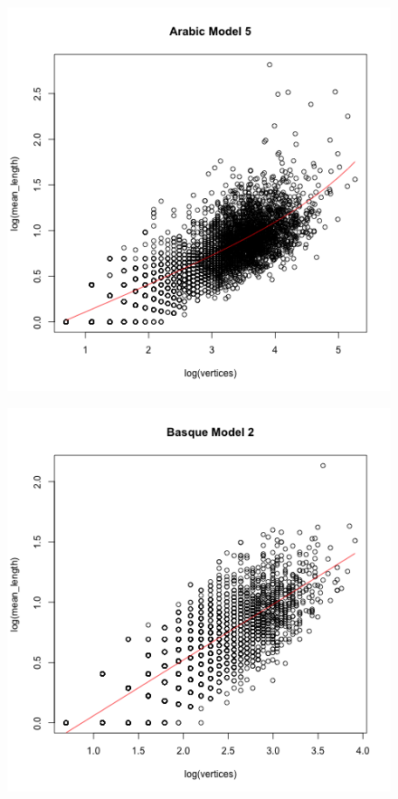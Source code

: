 \documentclass[paper=a4, fontsize=11pt]{scrartcl} %
\begin{document}
\captionsetup{justification=centering,margin=.2cm}

\begin{figure}
\centering
\begin{minipage}{.5\textwidth}
  \centering
  \includegraphics[width=\linewidth]{bestModel_Arabic.png}
  \label{fig:1}
\end{minipage}%
\begin{minipage}{.5\textwidth}
  \centering
  \includegraphics[width=\linewidth]{bestModel_Basque.png}

\end{minipage}
\end{figure}
\end{document}

